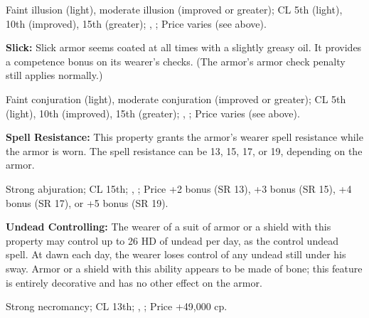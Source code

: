 Faint illusion (light), moderate illusion (improved or greater); CL 5th (light), 10th (improved), 15th (greater); , ; Price varies (see above).

\textbf{Slick:} Slick armor seems coated at all times with a slightly greasy oil. It provides a competence bonus on its wearer's  checks. (The armor's armor check penalty still applies normally.)


Faint conjuration (light), moderate conjuration (improved or greater); CL 5th (light), 10th (improved), 15th (greater); , ; Price varies (see above).

\textbf{Spell Resistance:} This property grants the armor's wearer spell resistance while the armor is worn. The spell resistance can be 13, 15, 17, or 19, depending on the armor.

Strong abjuration; CL 15th; , ; Price +2 bonus (SR 13), +3 bonus (SR 15), +4 bonus (SR 17), or +5 bonus (SR 19).



\textbf{Undead Controlling:} The wearer of a suit of armor or a shield with this property may control up to 26 HD of undead per day, as the control undead spell. At dawn each day, the wearer loses control of any undead still under his sway. Armor or a shield with this ability appears to be made of bone; this feature is entirely decorative and has no other effect on the armor.

Strong necromancy; CL 13th; , ; Price +49,000 cp.


